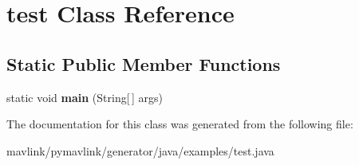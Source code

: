 \hypertarget{classtest}{}\section{test Class Reference}
\label{classtest}
\subsection*{Static Public Member Functions}
\begin{DoxyCompactItemize}
\item 
\mbox{\label{classtest_ad4ba96bceb9e7b2c011c5bf6cbabb965}} 
static void {\bfseries main} (String\mbox{[}$\,$\mbox{]} args)
\end{DoxyCompactItemize}


The documentation for this class was generated from the following file\+:\begin{DoxyCompactItemize}
\item 
mavlink/pymavlink/generator/java/examples/test.\+java\end{DoxyCompactItemize}
